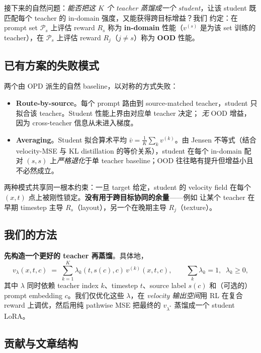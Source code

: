 \documentclass[11pt,a4paper]{article}
\theoremstyle{definition}
\begin{document}
接下来的自然问题：\emph{能否把这 $K$ 个 teacher 蒸馏成一个 student}，让该
student 既匹配每个 teacher 的 in-domain 强度，又能获得跨目标增益？我们
约定：在 prompt set $\mathcal{P}_s$ 上评估 reward $R_s$ 称为
\textbf{in-domain} 性能（$v^{(s)}$ 是为该 set 训练的 teacher），在
$\mathcal{P}_s$ 上评估 reward $R_j$（$j \neq s$）称为 \textbf{OOD} 性能。

\subsection{已有方案的失败模式}

两个由 OPD 派生的自然 baseline，以对称的方式失败：

\begin{itemize}[leftmargin=1.5em]
\item \textbf{Route-by-source}。每个 prompt 路由到 source-matched
teacher，student 只拟合该 teacher。Student 性能上界由对应单 teacher 决定；
\emph{无} OOD 增益，因为 cross-teacher 信息从未进入梯度。

\item \textbf{Averaging}。Student 拟合算术平均
$\bar v = \tfrac{1}{K}\sum_k v^{(k)}$。由 Jensen 不等式（结合
velocity-MSE 与 KL distillation 的等价关系），student 在每个
in-domain 配对 $(s, s)$ 上\emph{严格退化}于单 teacher baseline；OOD
往往略有提升但增益小且不必然成立。
\end{itemize}

两种模式共享同一根本约束：一旦 target 给定，student 的 velocity field
在每个 $(x, t)$ 点上被刚性锁定。\textbf{没有用于跨目标协同的余量}——例如
让某个 teacher 在早期 timestep 主导 $R_s$（layout），另一个在晚期主导
$R_j$（texture）。

\subsection{我们的方法}

\textbf{先构造一个更好的 teacher 再蒸馏}。具体地，
\begin{equation}
v_\lambda(x,t,c) \;=\; \sum_{k=1}^{K}\lambda_{k}(t,s(c),c)\,v^{(k)}(x,t,c),
\qquad
\sum_k \lambda_k = 1,\;\;\lambda_k\geq 0,
\label{eq:mof_intro}
\end{equation}
其中 $\lambda$ 同时依赖 teacher index $k$、timestep $t$、source label
$s(c)$ 和（可选的）prompt embedding $c$。我们仅优化这些 $\lambda$，在
\emph{velocity 输出空间}用 RL 在复合 reward 上调优，然后用纯 pathwise
MSE 把最终的 $v_{\lambda^*}$ 蒸馏成一个 student LoRA。

\subsection{贡献与文章结构}
\end{document}
